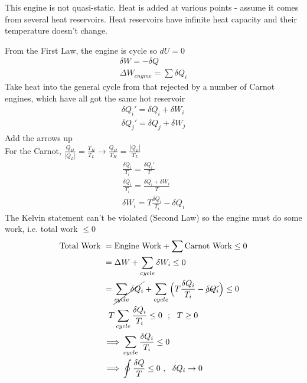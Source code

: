 \documentclass[a4paper, 11pt, normalem]{report}
\begin{document}
This engine is not quasi-static.
Heat is added at various points - assume it comes from several heat reservoirs.
Heat reservoirs have infinite heat capacity and their temperature doesn't change.

From the First Law, the engine is cycle so $dU = 0$
\begin{gather*}
    \delta W = -\delta Q \\
    \Delta W_{engine} = \sum \delta Q_i
\end{gather*}
Take heat into the general cycle from that rejected by a number of Carnot engines, which have all got the same hot reservoir
\begin{gather*}
    \delta Q_{i}' = \delta Q_i + \delta W_i \\
    \delta Q_{j}' = \delta Q_j + \delta W_j
\end{gather*}
Add the arrows up \\
 For the Carnot, $\frac{Q_H}{|Q_L|} = \frac{T_H}{T_L} \to \frac{Q_H}{T_H} = \frac{|Q_L|}{T_L}$
 \begin{gather*}
     \frac{\delta Q_i}{T_i} = \frac{\delta Q_{i}'}{T} \\
     \frac{\delta Q_i}{T_i} = \frac{\delta Q_i + \delta W_i}{T} \\
     \delta W_i = T\frac{\delta Q_i}{T_i} - \delta Q_i
 \end{gather*}
The Kelvin statement can't be violated (Second Law) so the engine must do some work, i.e. total work $\leq 0$
\begin{gather*}
    \begin{aligned}
        \text{Total Work } &= \text{Engine Work} + \sum \text{Carnot Work} \leq 0 \\
        &= \Delta W + \sum_{cycle} \delta W_i \leq 0 \\
        &= \cancel{\sum_{cycle} \delta Q_i} + \sum_{cycle} \Big(T\frac{\delta Q_i}{T_i} - \cancel{\delta Q_i} \Big) \leq 0
    \end{aligned} \\
    T\sum_{cycle} \frac{\delta Q_i}{T_i} \leq 0 ~~;~~ T \geq 0 \\
    \begin{aligned}
        \implies & \sum_{cycle} \frac{\delta Q_i}{T_i} \leq 0 \\
        \implies & \oint \frac{\delta Q}{T} \leq 0 ~,~~ \delta Q_i \to 0
    \end{aligned}
\end{gather*}
\end{document}
